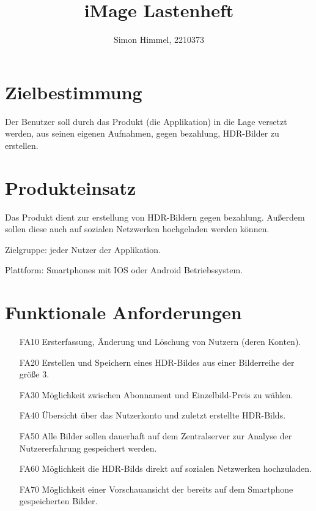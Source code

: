 \documentclass[parskip=full]{scrartcl}
\title{iMage Lastenheft}
\author{Simon Himmel, 2210373}
\begin{document}
\maketitle

%
%


%
%
\section{Zielbestimmung}
Der Benutzer soll durch das Produkt (die \gls{Applikation}) in die Lage versetzt werden, aus seinen eigenen Aufnahmen, gegen bezahlung, HDR-Bilder zu erstellen.

\section{Produkteinsatz}
Das Produkt dient zur erstellung von HDR-Bildern gegen bezahlung. Außerdem sollen diese auch auf sozialen Netzwerken hochgeladen werden können.

Zielgruppe: jeder Nutzer der Applikation.

Plattform: Smartphones mit IOS oder Android Betriebssystem.

\section{Funktionale Anforderungen}
\begin{itemize}[nosep]
\item[FA10] Ersterfassung, Änderung und Löschung von Nutzern (deren Konten).
\item[FA20] Erstellen und Speichern eines HDR-Bildes aus einer Bilderreihe der größe 3.
\item[FA30] Möglichkeit zwischen \gls{Abonnament} und Einzelbild-Preis zu wählen.
\item[FA40] Übersicht über das Nutzerkonto und zuletzt erstellte \glspl{HDR-Bild}.
\item[FA50] Alle Bilder sollen dauerhaft auf dem Zentralserver zur Analyse der Nutzererfahrung gespeichert werden.
\item[FA60] Möglichkeit die \glspl{HDR-Bild} direkt auf sozialen Netzwerken hochzuladen.
\item[FA70] Möglichkeit einer Vorschauansicht der bereits auf dem \gls{Smartphone} gespeicherten Bilder.
\end{itemize}
\end{document}
